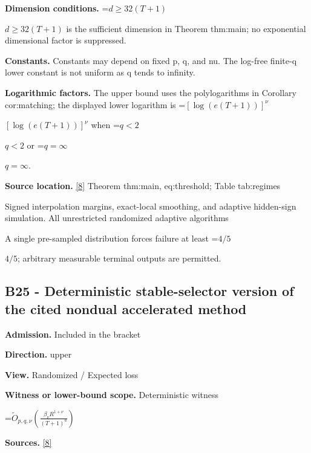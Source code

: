 \documentclass[10pt,a4paper]{article}
\newcommand{\AtlasMath}[1]{\par\begingroup\centering\setbox0=\hbox{$\displaystyle #1$}\ifdim\wd0>1.4\linewidth\typeout{ATLAS WIDE FORMULA: \the\wd0}\fi\ifdim\wd0>\linewidth\resizebox{\linewidth}{!}{\box0}\else\box0\fi\par\endgroup}
\newcommand{\AtlasInlineMath}[1]{\begingroup\setbox0=\hbox{$#1$}\ifdim\wd0>.4\linewidth\endgroup\AtlasMath{#1}\else\endgroup$#1$\fi}
\begin{document}
\textbf{Dimension conditions.} \AtlasInlineMath{d\ge32(T+1)} is the sufficient dimension in Theorem thm:main; no exponential dimensional factor is suppressed.



\textbf{Constants.} Constants may depend on fixed p, q, and nu. The log-free finite-q lower constant is not uniform as q tends to infinity.



\textbf{Logarithmic factors.} The upper bound uses the polylogarithms in Corollary cor:matching; the displayed lower logarithm is \AtlasInlineMath{[\log(e(T+1))]^\nu} when \AtlasInlineMath{q<2} or \AtlasInlineMath{q=\infty}.



\textbf{Source location.} \href{https://github.com/WU-Wendao/Colombo/blob/main/colombo_sensorium/Complexity_altas/data/sources/colombo/B1/manuscript.pdf}{[8]} Theorem thm:main, eq:threshold; Table tab:regimes



Signed interpolation margins, exact-local smoothing, and adaptive hidden-sign simulation. All unrestricted randomized adaptive algorithms



A single pre-sampled distribution forces failure at least \AtlasInlineMath{4/5}; arbitrary measurable terminal outputs are permitted.



\subsection{B25 - Deterministic stable-selector version of the cited nondual accelerated method}


\textbf{Admission.} Included in the bracket



\textbf{Direction.} upper



\textbf{View.} Randomized / Expected loss



\textbf{Witness or lower-bound scope.} Deterministic witness



\AtlasMath{\widetilde O_{p,q,\nu}\!\left(\frac{\beta_\nu R^{1+\nu}}{(T+1)^a}\right)}


\textbf{Sources.} \href{https://github.com/WU-Wendao/Colombo/blob/main/colombo_sensorium/Complexity_altas/data/sources/colombo/B1/manuscript.pdf}{[8]}
\end{document}
